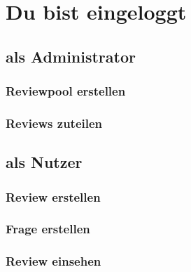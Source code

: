 \documentclass[12pt,a4paper]{scrreprt}
\begin{document}
\chapter{Du bist eingeloggt}
	\section{als Administrator}
		\subsection{Reviewpool erstellen}
		\subsection{Reviews zuteilen}
	\section{als Nutzer}
		\subsection{Review erstellen}
		\subsection{Frage erstellen}
		\subsection{Review einsehen}
		
\end{document}
